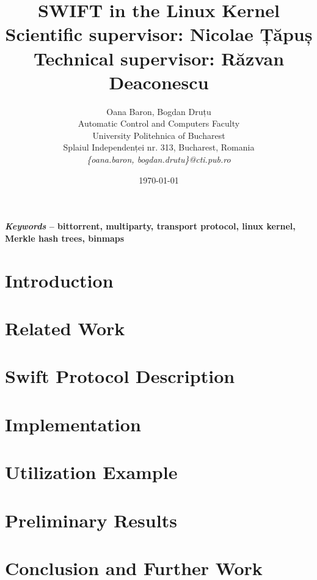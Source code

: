 \documentclass[12pt]{article}
\title{\bfseries{SWIFT in the Linux Kernel\\
\large{\vspace*{0.4cm}Scientific supervisor: Nicolae Țăpuș\\ Technical supervisor: Răzvan Deaconescu}}}
\author{Oana Baron, Bogdan Druțu\\
Automatic Control and Computers Faculty\\
University Politehnica of Bucharest\\
Splaiul Independenței nr. 313, Bucharest, Romania \\
\emph{\{oana.baron, bogdan.drutu\}@cti.pub.ro}}
\date{\today}
\begin{document}
\maketitle

\begin{abstract}

\end{abstract}

{\bf \hspace*{0.8cm} \textbf{\emph{Keywords}}  --  bittorrent, multiparty, transport protocol, linux kernel,\\
\hspace*{0.8cm} Merkle hash trees, binmaps}

\section{Introduction}
\label{sec:introduction}


\section{Related Work}
\label{sec:relatedwork}



\section{Swift Protocol Description}
\label{sec:swift}


\section{Implementation}
\label{sec:implementation}


\section{Utilization Example}
\label{sec:example}


\section{Preliminary Results}
\label{sec:results}


\section{Conclusion and Further Work}
\label{sec:summary}




\pagebreak



\end{document}
